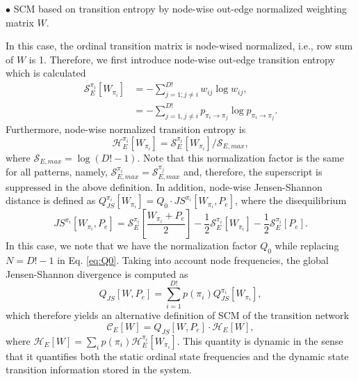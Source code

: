 \documentclass[12pt,aip,cha,reprint,nofootinbib]{revtex4-1}
\begin{document}
$\bullet$ SCM based on transition entropy by node-wise out-edge normalized
weighting matrix $W$.

In this case, the ordinal transition matrix is node-wised normalized, i.e., row
sum of $W$ is 1. Therefore, we first introduce node-wise out-edge transition entropy which is calculated 
\begin{equation}
\begin{split}
\mathcal{S}_{E}^{\pi_i}[W_{\pi_i}] &= - \sum_{j = 1; j \neq i}^{D!} w_{ij} \log w_{ij},  \\ 
&= - \sum_{j=1, j \neq i}^{D!} p_{\pi_i \to \pi_j} \log p_{\pi_i \to \pi_j}. 
\end{split}
\end{equation}
Furthermore, node-wise normalized transition entropy is 
\begin{equation}
\mathcal{H}_{E}^{\pi_i}[W_{\pi_i}] = \mathcal{S}_{E}^{\pi_i}[W_{\pi_i}] / \mathcal{S}_{E, max}, 
\end{equation}
where $\mathcal{S}_{E, max} = \log (D! - 1)$. Note that this normalization factor is the same for all patterns, namely, $\mathcal{S}_{E, max}^{\pi_i} = \mathcal{S}_{E, max}^{\pi_j}$ and, therefore, the superscript is suppressed in the above definition. In addition, node-wise Jensen-Shannon distance is defined as $Q_{JS}^{\pi_i}[W_{\pi_i}] = Q_0 \cdot JS^{\pi_i} [W_{\pi_i}, P_e]$, where the disequilibrium 
\begin{equation}
JS^{\pi_i} [W_{\pi_i}, P_e] = \mathcal{S}_{E}^{\pi_i}[\frac{W_{\pi_i} + P_e}{2}] - \frac{1}{2}\mathcal{S}_{E}^{\pi_i}[W_{\pi_i}] - \frac{1}{2}\mathcal{S}_{E}^{\pi_i}[P_e]. 
\end{equation}
In this case, we note that we have the normalization factor $Q_0$ while replacing $N = D! - 1$ in Eq. \eqref{eq:Q0}. Taking into account node frequencies, the global Jensen-Shannon divergence is computed as 
\begin{equation}
Q_{JS}[W, P_e] = \sum_{i=1}^{D!} p(\pi_i) Q_{JS}^{\pi_i}[W_{\pi_i}], 
\end{equation}
which therefore yields an alternative definition of SCM of the transition network 
\begin{equation}
\mathcal{C}_{E}[W] = Q_{JS}[W, P_e] \cdot \mathcal{H}_{E}[W], 
\end{equation}
where $\mathcal{H}_{E}[W] = \sum_{i} p(\pi_i) \mathcal{H}_{E}^{\pi_i}[W_{\pi_i}]$. This quantity is dynamic in the sense that it quantifies both the static ordinal state frequencies and the dynamic state transition information stored in the system. 
\end{document}
